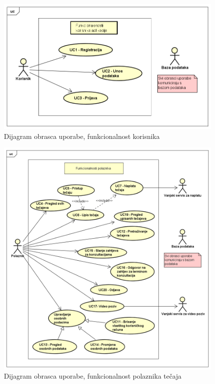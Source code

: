 					\begin{figure}[h]
						\includegraphics[scale=0.68]{dijagrami/UML_kor.PNG}
						\centering
						\caption{Dijagram obrasca uporabe, funkcionalnost korisnika}
						\label{fig:UML_kor}
					\end{figure}
				\eject
					
					\begin{figure}[h]
						\includegraphics[scale=0.55]{dijagrami/UML_pol.PNG}
						\centering
						\caption{Dijagram obrasca uporabe, funkcionalnost polaznika tečaja}
						\label{fig:UML_pol}
					\end{figure}
				\eject
				
